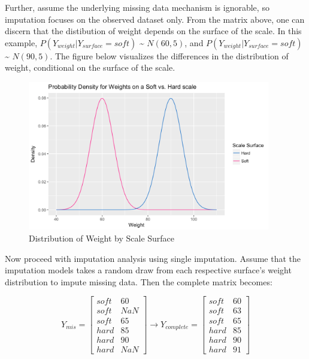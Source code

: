 \documentclass[12pt,oneside]{chicagocapstone}
\begin{document}
Further, assume the underlying missing data mechanism is ignorable, so
imputation focuses on the observed dataset only. From the matrix above,
one can discern that the distibution of weight depends on the surface of
the scale. In this example, \(P(Y_{weight}|Y_{surface}=soft)\)
\textasciitilde{} \(N(60, 5)\), and \(P(Y_{weight}|Y_{surface}=soft)\)
\textasciitilde{} \(N(90, 5)\). The figure below visualizes the
differences in the distribution of weight, conditional on the surface of
the scale.
\begin{figure}

{\centering \includegraphics[width=400px]{figure/scale-distribution} 

}

\caption{Distribution of Weight by Scale Surface}\label{fig:scale-distribution}
\end{figure}
Now proceed with imputation analysis using single imputation. Assume
that the imputation models takes a random draw from each respective
surface's weight distribution to impute missing data. Then the complete
matrix becomes:

\[Y_{mis}=\begin{bmatrix}soft & 60 \\ soft & NaN \\ soft & 65 \\ hard & 85 \\ hard & 90 \\ hard & NaN \end{bmatrix} \rightarrow Y_{complete}=\begin{bmatrix}soft & 60 \\ soft & 63 \\ soft & 65 \\ hard & 85 \\ hard & 90 \\ hard & 91 \end{bmatrix}\]
\end{document}
